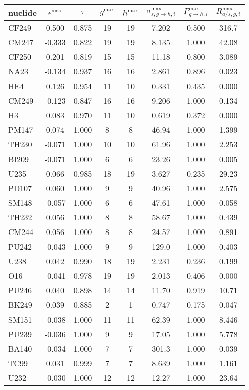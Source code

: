 \begin{tabular}{|l|ccccccc|}
\hline
nuclide & $\epsilon^{\max}$ & $\tau$ & $g^{\max}$ & $h^{\max}$ & $\sigma_{s,g\to h,i}^{\max}$ & $P_{g\to h,i}^{\max}$ & $R_{a/s,g,i}^{\max}$\\
\hline
CF249 & 0.500 & 0.875 & 19 & 19 & 7.202 & 0.500 & 316.7\\
CM247 & -0.333 & 0.822 & 19 & 19 & 8.135 & 1.000 & 42.08\\
CF250 & 0.201 & 0.819 & 15 & 15 & 11.18 & 0.800 & 3.089\\
NA23 & -0.134 & 0.937 & 16 & 16 & 2.861 & 0.896 & 0.023\\
HE4 & 0.126 & 0.954 & 11 & 10 & 0.331 & 0.435 & 0.000\\
CM249 & -0.123 & 0.847 & 16 & 16 & 9.206 & 1.000 & 0.134\\
H3 & 0.083 & 0.970 & 11 & 10 & 0.619 & 0.372 & 0.000\\
PM147 & 0.074 & 1.000 & 8 & 8 & 46.94 & 1.000 & 1.399\\
TH230 & -0.071 & 1.000 & 10 & 10 & 61.96 & 1.000 & 2.253\\
BI209 & -0.071 & 1.000 & 6 & 6 & 23.26 & 1.000 & 0.005\\
U235 & 0.066 & 0.985 & 18 & 19 & 3.627 & 0.235 & 29.23\\
PD107 & 0.060 & 1.000 & 9 & 9 & 40.96 & 1.000 & 2.575\\
SM148 & -0.057 & 1.000 & 6 & 6 & 47.61 & 1.000 & 0.058\\
TH232 & 0.056 & 1.000 & 8 & 8 & 58.67 & 1.000 & 0.439\\
CM244 & 0.056 & 1.000 & 8 & 8 & 24.57 & 1.000 & 0.891\\
PU242 & -0.043 & 1.000 & 9 & 9 & 129.0 & 1.000 & 0.403\\
U238 & 0.042 & 0.990 & 18 & 19 & 2.231 & 0.236 & 0.199\\
O16 & -0.041 & 0.978 & 19 & 19 & 2.013 & 0.406 & 0.000\\
PU246 & 0.040 & 0.898 & 14 & 14 & 11.70 & 0.919 & 10.71\\
BK249 & 0.039 & 0.885 & 2 & 1 & 0.747 & 0.175 & 0.047\\
SM151 & -0.038 & 1.000 & 11 & 11 & 62.39 & 1.000 & 8.446\\
PU239 & -0.036 & 1.000 & 9 & 9 & 17.05 & 1.000 & 5.778\\
BA140 & -0.034 & 1.000 & 7 & 7 & 301.3 & 1.000 & 0.039\\
TC99 & 0.031 & 0.999 & 7 & 7 & 8.639 & 1.000 & 1.161\\
U232 & -0.030 & 1.000 & 12 & 12 & 12.27 & 1.000 & 23.64\\

\end{tabular}
